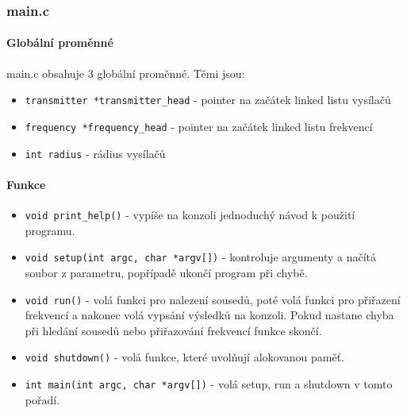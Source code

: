 \documentclass[12pt]{article}
\begin{document}
\subsubsection{main.c}
%
\paragraph{Globální proměnné}
main.c obsahuje 3 globální proměnné. Těmi jsou:
%
\begin{itemize}
	\item \texttt{transmitter *transmitter\_head} - pointer na začátek linked
		listu vysílačů
	\item \texttt{frequency *frequency\_head} - pointer na začátek linked
		listu frekvencí
	\item \texttt{int radius} - rádius vysílačů
\end{itemize}
%
\paragraph{Funkce}
%
\begin{itemize}
	\item \texttt{void print\_help()} - vypíše na konzoli jednoduchý
		návod k použití programu.
	\item \texttt{void setup(int argc, char *argv[])} - kontroluje
		argumenty a načítá soubor z parametru, popřípadě ukončí
		program při chybě.
	\item \texttt{void run()} - volá funkci pro nalezení sousedů, poté volá
		funkci pro přiřazení frekvencí a nakonec volá vypsání výsledků
		na konzoli. Pokud nastane chyba při hledání sousedů nebo 
		přiřazování frekvencí funkce skončí.
	\item \texttt{void shutdown()} - volá funkce, které uvolňují alokovanou
		paměť.
	\item \texttt{int main(int argc, char *argv[])} - volá setup, run a 
		shutdown v tomto pořadí.
\end{itemize}
%
\end{document}
